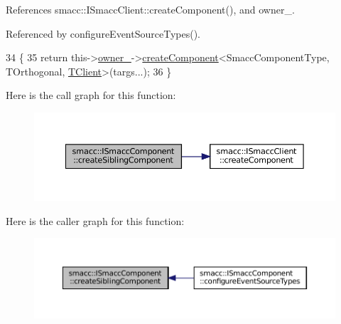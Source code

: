 References smacc\+::\+I\+Smacc\+Client\+::create\+Component(), and owner\+\_\+.



Referenced by configure\+Event\+Source\+Types().


\begin{DoxyCode}
34     \{
35         \textcolor{keywordflow}{return} this->\hyperlink{classsmacc_1_1ISmaccComponent_a909590e672450ce0eb0d8facb45c737a}{owner\_}->\hyperlink{classsmacc_1_1ISmaccClient_a5c1c8eb5e91a3b399662a52cb0ca86aa}{createComponent}<SmaccComponentType, TOrthogonal, 
      \hyperlink{classTClient}{TClient}>(targs...);
36     \}
\end{DoxyCode}
Here is the call graph for this function\+:
\nopagebreak
\begin{figure}[H]
\begin{center}
\leavevmode
\includegraphics[width=350pt]{classsmacc_1_1ISmaccComponent_a85a3f70369d18176aa0a28c3ba31b945_cgraph}
\end{center}
\end{figure}
Here is the caller graph for this function\+:
\nopagebreak
\begin{figure}[H]
\begin{center}
\leavevmode
\includegraphics[width=350pt]{classsmacc_1_1ISmaccComponent_a85a3f70369d18176aa0a28c3ba31b945_icgraph}
\end{center}
\end{figure}
\mbox{\label{classsmacc_1_1ISmaccComponent_a86afd97c9eaed89073def7c51a3c86ab}} 
